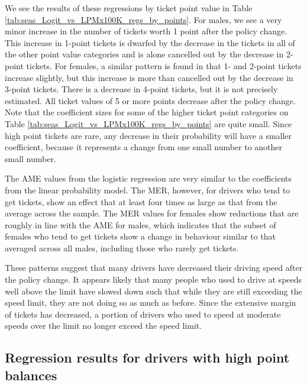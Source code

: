 We see the results of these regressions by ticket point value in 
Table \ref{tab:seas_Logit_vs_LPMx100K_regs_by_points}. 
For males, we see a very minor increase in the number of tickets 
worth 1 point after the policy change. 
This increase in 1-point tickets is dwarfed by the decrease in the tickets 
in all of the other point value categories and is alone cancelled out 
by the decrease in 2-point tickets. 
For females, a similar pattern is found in that 1- and 2-point tickets increase slightly,
but this increase is more than cancelled out by the decrease in 3-point tickets. 
There is a decrease in 4-point tickets, but it is not precisely estimated. 
All ticket values of 5 or more points decrease after the policy change. 
Note that the coefficient sizes for some of the higher ticket point categories on 
Table \ref{tab:seas_Logit_vs_LPMx100K_regs_by_points}
are quite small. Since high point tickets are rare, any decrease in their probability will have a smaller coefficient, 
because it represents a change from one small number to another small number.

The AME values from the logistic regression are very similar to
the coefficients from the linear probability model. 
The MER, however, for drivers who tend to get tickets, 
show an effect that at least four times as large 
as that from the average across the sample. 
The MER values for females show reductions 
that are roughly in line with the AME for males, 
which indicates that the subset of females who tend to get tickets
show a change in behaviour similar to that 
averaged across all males, including those who rarely get tickets. 


These patterns suggest that many drivers have decreased their driving speed 
after the policy change. 
It appears likely that many people who used to drive at speeds well above the limit 
have slowed down such that while they are still exceeding the speed limit, 
they are not doing so as much as before. 
Since the extensive margin of tickets has decreased, a portion of drivers who used to speed at moderate speeds over the limit 
no longer exceed the speed limit.

\subsection{Regression results for drivers with high point balances}
\label{sec:Empirical_high_pts}






